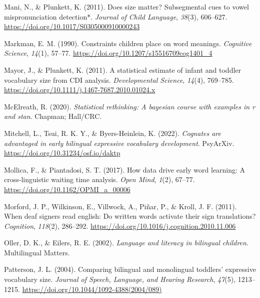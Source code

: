 \documentclass[
  man,
  floatsintext,
  colorlinks=true,linkcolor=blue,citecolor=blue,urlcolor=blue,biblatex]{apa7}
\newlength{\cslhangindent}
\newlength{\cslentryspacingunit} %
\newenvironment{CSLReferences}[2] %
 {%
  \setlength{\parindent}{0pt}
  \ifodd #1
  \let\oldpar\par
  \def\par{\hangindent=\cslhangindent\oldpar}
  \fi
  \setlength{\parskip}{#2\cslentryspacingunit}
 }%
 {}
\begin{document}
\begin{CSLReferences}{1}{0}
\leavevmode{}%
Mani, N., \& Plunkett, K. (2011). Does size matter? Subsegmental cues to
vowel mispronunciation detection*. \emph{Journal of Child Language},
\emph{38}(3), 606--627. \url{https://doi.org/10.1017/S0305000910000243}

\leavevmode{}%
Markman, E. M. (1990). Constraints children place on word meanings.
\emph{Cognitive Science}, \emph{14}(1), 57--77.
\url{https://doi.org/10.1207/s15516709cog1401_4}

\leavevmode{}%
Mayor, J., \& Plunkett, K. (2011). A statistical estimate of infant and
toddler vocabulary size from {CDI} analysis. \emph{Developmental
Science}, \emph{14}(4), 769--785.
\url{https://doi.org/10.1111/j.1467-7687.2010.01024.x}

\leavevmode{}%
McElreath, R. (2020). \emph{Statistical rethinking: A bayesian course
with examples in r and stan}. Chapman; Hall/{CRC}.

\leavevmode{}%
Mitchell, L., Tsui, R. K. Y., \& Byers-Heinlein, K. (2022).
\emph{Cognates are advantaged in early bilingual expressive vocabulary
development}. {PsyArXiv}. \url{https://doi.org/10.31234/osf.io/daktp}

\leavevmode{}%
Mollica, F., \& Piantadosi, S. T. (2017). How data drive early word
learning: A cross-linguistic waiting time analysis. \emph{Open Mind},
\emph{1}(2), 67--77. \url{https://doi.org/10.1162/OPMI_a_00006}

\leavevmode{}%
Morford, J. P., Wilkinson, E., Villwock, A., Piñar, P., \& Kroll, J. F.
(2011). When deaf signers read english: Do written words activate their
sign translations? \emph{Cognition}, \emph{118}(2), 286--292.
\url{https://doi.org/10.1016/j.cognition.2010.11.006}

\leavevmode{}%
Oller, D. K., \& Eilers, R. E. (2002). \emph{Language and literacy in
bilingual children}. Multilingual Matters.

\leavevmode{}%
Patterson, J. L. (2004). Comparing bilingual and monolingual toddlers'
expressive vocabulary size. \emph{Journal of Speech, Language, and
Hearing Research}, \emph{47}(5), 1213--1215.
\url{https://doi.org/10.1044/1092-4388(2004/089)}


\end{CSLReferences}
\end{document}

